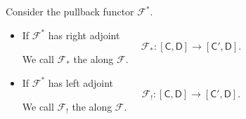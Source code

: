 \documentclass[notes.tex]{subfiles}
\begin{document}
\begin{definition}
  \label{def:kan_extension}
  Consider the pullback functor $\mathcal{F}^{*}$.
  
  \begin{itemize}
    \item If $\mathcal{F}^{*}$ has right adjoint
      \begin{equation*}
        \mathcal{F}_{*}\colon [\mathsf{C}, \mathsf{D}] \to [\mathsf{C}', \mathsf{D}].
      \end{equation*}
      We call $\mathcal{F}_{*}$ the  along $\mathcal{F}$.

    \item If $\mathcal{F}^{*}$ has left adjoint
      \begin{equation*}
        \mathcal{F}_{!}\colon [\mathsf{C}, \mathsf{D}] \to [\mathsf{C}', \mathsf{D}].
      \end{equation*}
      We call $\mathcal{F}_{!}$ the  along $\mathcal{F}$. 
  \end{itemize}
\end{definition}
\end{document}

